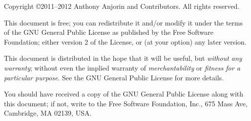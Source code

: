 \documentclass[11pt,a4paper, twoside]{book}
\begin{document}
  

\frontmatter 

\maketitle

\begin{small} 
  Copyright \copyright 2011--2012 Anthony Anjorin and Contributors. All rights
  reserved.

  This document is free; you can redistribute it and/or modify it
  under the terms of the GNU General Public License as published by
  the Free Software Foundation; either version 2 of the License, or
  (at your option) any later version.
 
  This document is distributed in the hope that it will be useful, but
  \emph{without any warranty}; without even the implied warranty of
  \emph{merchantability} or \emph{fitness for a particular purpose}.
  See the GNU General Public License for more details.
 
  You should have received a copy of the GNU General Public License
  along with this document; if not, write to the Free Software
  Foundation, Inc., 675 Mass Ave, Cambridge, MA 02139, USA.
\end{small}


\tableofcontents

\mainmatter





\end{document}
